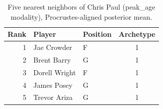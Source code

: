 \begin{table}[htbp]
  \centering\small
  \begin{tabular}{rllc}
    \toprule
    Rank & Player & Position & Archetype \\
    \midrule
    1 & Jae Crowder & F & 1 \\
    2 & Brent Barry & G & 1 \\
    3 & Dorell Wright & F & 1 \\
    4 & James Posey & G & 1 \\
    5 & Trevor Ariza & G & 1 \\
    \bottomrule
  \end{tabular}
  \caption{Five nearest neighbors of Chris Paul (peak_age modality), Procrustes-aligned posterior mean.}
  \label{tab:Chris_Paul_neighbors_peak_age}
\end{table}

